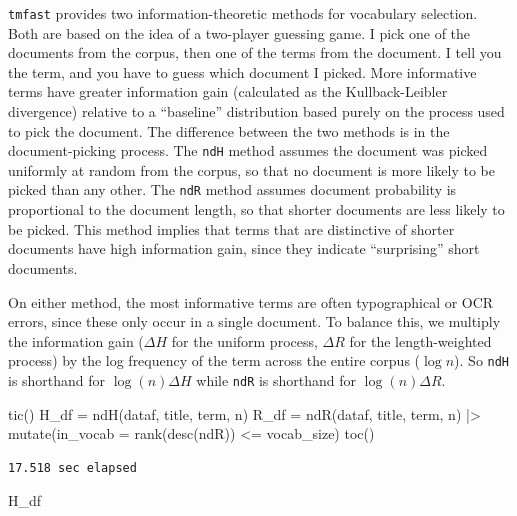 \documentclass[
]{article}
\newenvironment{Shaded}{\begin{snugshade}}{\end{snugshade}}
\newcommand{\AttributeTok}[1]{\textcolor[rgb]{0.40,0.45,0.13}{#1}}
\newcommand{\FunctionTok}[1]{\textcolor[rgb]{0.28,0.35,0.67}{#1}}
\newcommand{\NormalTok}[1]{\textcolor[rgb]{0.00,0.23,0.31}{#1}}
\newcommand{\OtherTok}[1]{\textcolor[rgb]{0.00,0.23,0.31}{#1}}
\newcommand{\SpecialCharTok}[1]{\textcolor[rgb]{0.37,0.37,0.37}{#1}}
\begin{document}
\texttt{tmfast} provides two information-theoretic methods for
vocabulary selection. Both are based on the idea of a two-player
guessing game. I pick one of the documents from the corpus, then one of
the terms from the document. I tell you the term, and you have to guess
which document I picked. More informative terms have greater information
gain (calculated as the Kullback-Leibler divergence) relative to a
``baseline'' distribution based purely on the process used to pick the
document. The difference between the two methods is in the
document-picking process. The \texttt{ndH} method assumes the document
was picked uniformly at random from the corpus, so that no document is
more likely to be picked than any other. The \texttt{ndR} method assumes
document probability is proportional to the document length, so that
shorter documents are less likely to be picked. This method implies that
terms that are distinctive of shorter documents have high information
gain, since they indicate ``surprising'' short documents.

On either method, the most informative terms are often typographical or
OCR errors, since these only occur in a single document. To balance
this, we multiply the information gain (\(\Delta H\) for the uniform
process, \(\Delta R\) for the length-weighted process) by the log
frequency of the term across the entire corpus (\(\log n\)). So
\texttt{ndH} is shorthand for \(\log(n) \Delta H\) while \texttt{ndR} is
shorthand for \(\log(n) \Delta R\).

\begin{Shaded}
\begin{Highlighting}[]
\FunctionTok{tic}\NormalTok{()}
\NormalTok{H\_df }\OtherTok{=} \FunctionTok{ndH}\NormalTok{(dataf, title, term, n)}
\NormalTok{R\_df }\OtherTok{=} \FunctionTok{ndR}\NormalTok{(dataf, title, term, n) }\SpecialCharTok{|\textgreater{}}
    \FunctionTok{mutate}\NormalTok{(}\AttributeTok{in\_vocab =} \FunctionTok{rank}\NormalTok{(}\FunctionTok{desc}\NormalTok{(ndR)) }\SpecialCharTok{\textless{}=}\NormalTok{ vocab\_size)}
\FunctionTok{toc}\NormalTok{()}
\end{Highlighting}
\end{Shaded}

\begin{verbatim}
17.518 sec elapsed
\end{verbatim}

\begin{Shaded}
\begin{Highlighting}[]
\NormalTok{H\_df}
\end{Highlighting}
\end{Shaded}
\end{document}
